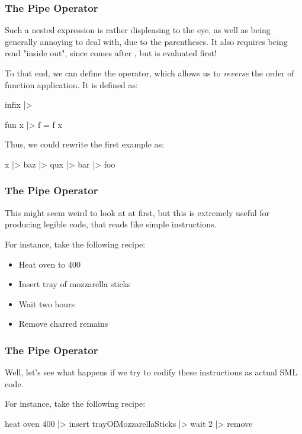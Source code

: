 \documentclass[aspectratio=169]{beamer}
\begin{document}
\begin{frame}[fragile]
  \frametitle{The Pipe Operator}

  Such a nested expression is rather displeasing to the eye, as well as being 
  generally annoying to deal with, due to the parentheses. It also requires being
  read "inside out", since  comes after , but is evaluated first!

  \pause
  \vspace{\fill}

  To that end, we can define the \code{|>}\footnotemark operator, which allows us to
  \textit{reverse} the order of function application. It is defined as: 

  \pause
  \begin{codeblock}
    infix |> 

    fun x |> f = f x 
  \end{codeblock}

  \pause
  \vspace{\fill}

  Thus, we could rewrite the first example as:

  \begin{codeblock}
    x |> baz |> qux |> bar |> foo
  \end{codeblock}

\end{frame}

\begin{frame}[fragile]
  \frametitle{The Pipe Operator}

  This might seem weird to look at at first, but this is extremely useful for
  producing legible code, that reads like simple instructions.

  \pause
  \vspace{\fill}

  For instance, take the following recipe:
  \begin{itemize}
    \item Heat oven to 400
    \item Insert tray of mozzarella sticks 
    \item Wait two hours
    \item Remove charred remains 
  \end{itemize}
\end{frame}

\begin{frame}[fragile]
  \frametitle{The Pipe Operator}

  Well, let's see what happens if we try to codify these instructions as 
  actual SML code.

  \pause
  \vspace{\fill}

  For instance, take the following recipe:
  \begin{codeblock}
    heat oven 400
    |> insert trayOfMozzarellaSticks
    |> wait 2 
    |> remove
  \end{codeblock}
\end{frame}
\end{document}
